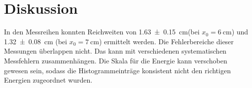 \section{Diskussion}
In den Messreihen konnten Reichweiten von \qty{1.63 \pm 0.15}{\cm}(bei $x_0 = \qty{6}{\cm}$)  und 
\qty{1.32 \pm 0.08}{\cm} (bei $x_0 = \qty{7}{\cm}$) ermittelt werden.
Die Fehlerbereiche dieser Messungen überlappen nicht.
Das kann mit verschiedenen systematischen Messfehlern zusammenhängen.
Die Skala für die Energie kann verschoben gewesen sein, sodass die Histogrammeinträge
konsistent nicht den richtigen Energien zugeordnet wurden.
